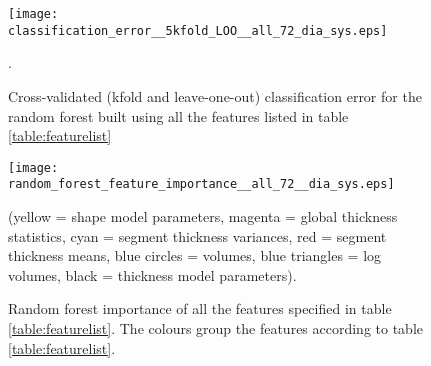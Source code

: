 \documentclass{llncs}
\begin{document}
	
	\begin{figure}[]
	\begin{center}
	

		\texttt{[image: classification\_error\_\_5kfold\_LOO\_\_all\_72\_dia\_sys.eps]}
\caption{Cross-validated (kfold and leave-one-out) classification error for the random forest built using all the features listed in table \ref{table:featurelist}}.	
\label{fig:classification_error__5kfold_LOO__all_72_dia_sys}			\end{center}
		\end{figure}
		\begin{figure}[]
		\begin{center}
		
		
		\texttt{[image: random\_forest\_feature\_importance\_\_all\_72\_\_dia\_sys.eps]}
\caption{Random forest importance of all the features specified in table \ref{table:featurelist}. The colours group the features according to table \ref{table:featurelist}.} (yellow = shape model parameters, magenta = global thickness statistics, cyan = segment thickness variances, red = segment thickness means, blue circles = volumes, blue triangles = log volumes, black = thickness model parameters).
\label{fig:random_forest_feature_importance__all_72__dia_sys}		\end{center}
	\end{figure}
	
	
\end{document}
